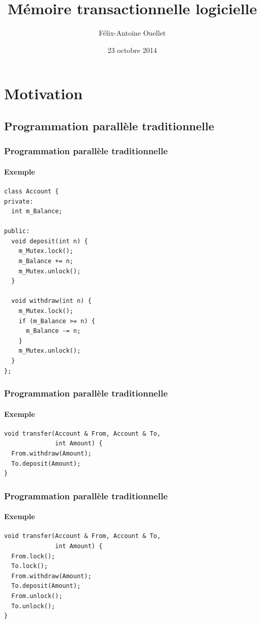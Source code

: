 \documentclass{beamer}
\author[Félix-Antoine Ouellet]{Félix-Antoine Ouellet}
\title[MTL\hspace{2em}\insertframenumber/\inserttotalframenumber]{Mémoire transactionnelle logicielle}
\institute{Université de Sherbrooke}
\date{23 octobre 2014}
\begin{document}
\begin{frame}
\titlepage %
\end{frame}

\begin{frame}
\tableofcontents[hideallsubsections]
\end{frame}

\section{Motivation}
\subsection{Programmation parallèle traditionnelle}

\newlength\someheight
\setlength\someheight{3.5cm}

\begin{frame}[fragile]
\frametitle{Programmation parallèle traditionnelle}
\framesubtitle{Exemple}
\begin{adjustbox}{width=\textwidth,height=\someheight,keepaspectratio}
\begin{lstlisting}
class Account {
private:
  int m_Balance;
  
public:
  void deposit(int n) {
    m_Mutex.lock();
    m_Balance += n;
    m_Mutex.unlock();
  }

  void withdraw(int n) {
    m_Mutex.lock();
    if (m_Balance >= n) {
      m_Balance -= n;
    }
    m_Mutex.unlock();
  }
};
\end{lstlisting}
\end{adjustbox}
\end{frame}

\begin{frame}[fragile]
\frametitle{Programmation parallèle traditionnelle}
\framesubtitle{Exemple}
\begin{lstlisting}
void transfer(Account & From, Account & To, 
              int Amount) {
  From.withdraw(Amount);
  To.deposit(Amount);
}
\end{lstlisting}
\end{frame}

\begin{frame}[fragile]
\frametitle{Programmation parallèle traditionnelle}
\framesubtitle{Exemple}
\begin{lstlisting}
void transfer(Account & From, Account & To, 
              int Amount) {
  From.lock();
  To.lock();
  From.withdraw(Amount);
  To.deposit(Amount);
  From.unlock();
  To.unlock();
}
\end{lstlisting}
\end{frame}
\end{document}
